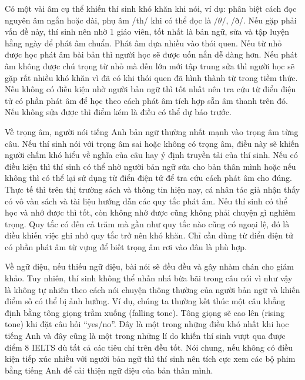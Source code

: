 \vspace{.25cm}
Có một vài âm cụ thể khiến thí sinh khó khăn khi nói, ví dụ: phân biệt cách đọc nguyên âm ngắn hoặc dài, phụ âm /th/ khi có thể đọc là $/\theta/$, /ð/. Nếu gặp phải vấn đề này, thí sinh nên nhờ 1 giáo viên, tốt nhất là bản ngữ, sửa và tập luyện hằng ngày để phát âm chuẩn. Phát âm dựa nhiều vào thói quen. Nếu từ nhỏ được học phát âm bài bản thì người học sẽ được uốn nắn dễ dàng hơn. Nếu phát âm không được chú trọng từ nhỏ mà đến lớn mới tập trung sửa thì người học sẽ gặp rất nhiều khó khăn vì đã có khi thói quen đã hình thành từ trong tiềm thức. Nếu không có điều kiện nhờ người bản ngữ thì tốt nhất nên tra cứu từ điển điện tử có phần phát âm để học theo cách phát âm tích hợp sẵn âm thanh trên đó. Nếu không sửa được thì điểm kém là điều có thể dự báo trước.  

\vspace{.25cm}
Về trọng âm, người nói tiếng Anh bản ngữ thường nhất mạnh vào trọng âm từng câu. Nếu thí sinh nói với trọng âm sai hoặc không có trọng âm, điều này sẽ khiến người chấm khó hiểu về nghĩa của câu hay ý định truyền tải của thí sinh. Nếu có điều kiện thì thí sinh có thể nhờ người bản ngữ sửa cho bản thân mình hoặc nếu không thì có thể lại sử dụng từ điển điện tử để tra cứu cách phát âm cho đúng. Thực tế thì trên thị trường sách và thông tin hiện nay, cá nhân tác giả nhận thấy có vô vàn sách và tài liệu hướng dẫn các quy tắc phát âm. Nếu thí sinh có thể học và nhớ được thì tốt, còn không nhớ được cũng không phải chuyện gì nghiêm trọng. Quy tắc có đến cả trăm mà gần như quy tắc nào cũng có ngoại lệ, đó là điều khiến việc ghi nhớ quy tắc trở nên khó khăn. Chỉ cần dùng từ điển điện tử có phần phát âm từ vựng để biết trọng âm rơi vào đâu là phù hợp.  

\vspace{.25cm}
Về ngữ điệu, nếu thiếu ngữ điệu, bài nói sẽ đều đều và gây nhàm chán cho giám khảo. Tuy nhiên, thí sinh không thể nhấn nhá bừa bãi trong câu nói vì như vậy là không tự nhiên theo cách nói chuyện thông thường của người bản ngữ và khiến điểm số có thể bị ảnh hưởng. Ví dụ, chúng ta thường kết thúc một câu khẳng định bằng tông giọng trầm xuống (falling tone). Tông giọng sẽ cao lên (rising tone) khi đặt câu hỏi “yes/no”. Đây là một trong những điều khó nhất khi học tiếng Anh và đây cũng là một trong những lí do khiến thí sinh vượt qua được điểm 8 IELTS dù tất cả các tiêu chí trên đều tốt. Nói chung, nếu không có điều kiện tiếp xúc nhiều với người bản ngữ thì thí sinh nên tích cực xem các bộ phim bằng tiếng Anh để cải thiện ngữ điệu của bản thân mình.  

